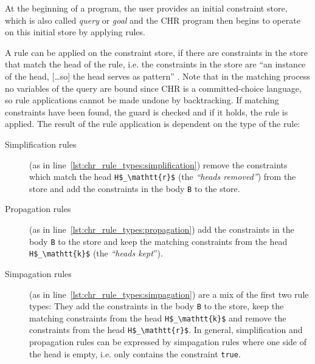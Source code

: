 At the beginning of a program, the user provides an initial constraint store, which is also called \emph{query} or \emph{goal} and the CHR program then begins to operate on this initial store by applying rules.

A rule can be applied on the constraint store, if there are constraints in the store that match the head of the rule, i.e. the constraints in the store are ``an instance of the head, [\dots so] the head serves as pattern'' \cite[11]{fru_chr_book_2009}. Note that in the matching process no variables of the query are bound since CHR is a committed-choice language, so rule applications cannot be made undone by backtracking. If matching constraints have been found, the guard is checked and if it holds, the rule is applied. The result of the rule application is dependent on the type of the rule:

\begin{description}
 \item[Simplification rules] (as in line~\ref{lst:chr_rule_types:simplification}) remove the constraints which match the head \lstinline[mathescape]|H$_\mathtt{r}$| (the \emph{``heads removed''}) from the store and add the constraints in the body \lstinline|B| to the store.
 \item[Propagation rules] (as in line~\ref{lst:chr_rule_types:propagation}) add the constraints in the body \lstinline|B| to the store and keep the matching constraints from the head \lstinline[mathescape]|H$_\mathtt{k}$| (the \emph{``heads kept}'').
 \item[Simpagation rules] (as in line~\ref{lst:chr_rule_types:simpagation}) are a mix of the first two rule types: They add the constraints in the body \lstinline|B| to the store, keep the matching constraints from the head \lstinline[mathescape]|H$_\mathtt{k}$| and remove the constraints from the head \lstinline[mathescape]|H$_\mathtt{r}$|. In general, simplification and propagation rules can be expressed by simpagation rules where one side of the head is empty, i.e. only contains the constraint \lstinline|true|.
\end{description}

